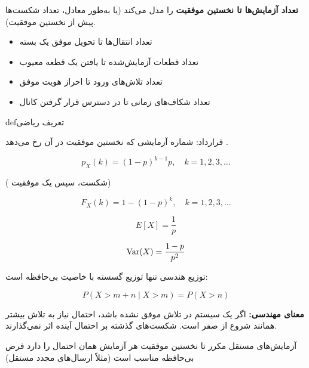 \textbf{تعداد آزمایش‌ها تا نخستین موفقیت} را مدل می‌کند (یا به‌طور معادل، تعداد شکست‌ها پیش از نخستین موفقیت).


\begin{itemize}
\tightlist
\item
  تعداد انتقال‌ها تا تحویل موفق یک بسته
\item
  تعداد قطعات آزمایش‌شده تا یافتن یک قطعه معیوب
\item
  تعداد تلاش‌های ورود تا احراز هویت موفق
\item
  تعداد شکاف‌های زمانی تا در دسترس قرار گرفتن کانال
\end{itemize}

\begin{PSbox}[unbreakable]{def}{تعریف ریاضی}


قرارداد:  شماره آزمایشی که نخستین موفقیت در آن رخ می‌دهد .

\end{PSbox}


\[p_X(k) = (1-p)^{k-1} p, \quad k = 1, 2, 3, \ldots\]

( شکست، سپس یک موفقیت)


\[F_X(k) = 1 - (1-p)^k, \quad k = 1, 2, 3, \ldots\]


\[E[X] = \frac{1}{p}\]


\[\text{Var}(X) = \frac{1-p}{p^2}\]


توزیع هندسی تنها توزیع گسسته با خاصیت بی‌حافظه است:

\[P(X > m + n \mid X > m) = P(X > n)\]

\textbf{معنای مهندسی:} اگر یک سیستم در  تلاش موفق نشده باشد، احتمال نیاز به  تلاش بیشتر همانند شروع از صفر است. شکست‌های گذشته بر احتمال آینده اثر نمی‌گذارند.


\lr{\PSyes{}} آزمایش‌های مستقل مکرر تا نخستین موفقیت\PSbr{}\lr{\PSyes{}} هر آزمایش همان احتمال را دارد\PSbr{}\lr{\PSyes{}} فرض بی‌حافظه مناسب است (مثلاً ارسال‌های مجدد مستقل)

